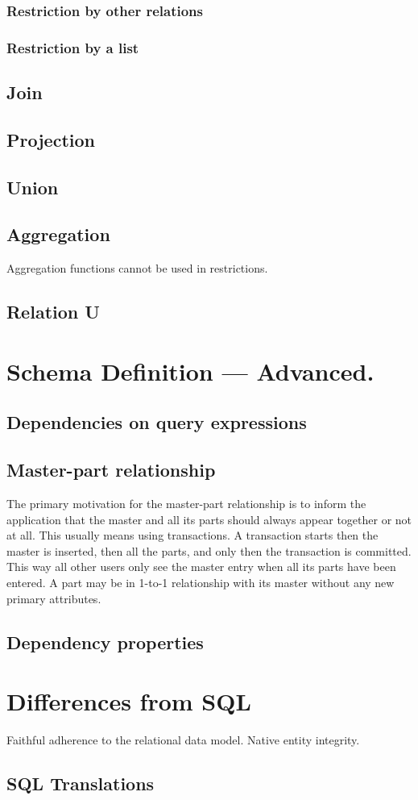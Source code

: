 \documentclass[letter,10pt]{article}
\begin{document}
\subsubsection{Restriction by other relations}
\subsubsection{Restriction by a list}

\subsection{Join}
\subsection{Projection}
\subsection{Union}
\subsection{Aggregation}
Aggregation functions cannot be used in restrictions. 
\subsection{Relation U}

\section{Schema Definition --- Advanced.}
\subsection{Dependencies on query expressions}
\subsection{Master-part relationship}
The primary motivation for the master-part relationship is to inform the application that the master and all its parts should always appear together or not at all.  
This usually means using transactions.  
A transaction starts then the master is inserted, then all the parts, and only then the transaction is committed.  
This way all other users only see the master entry when all its parts have been entered.
A part may be in 1-to-1 relationship with its master without any new primary attributes.
\subsection{Dependency properties}

\appendix

\section{Differences from SQL}
Faithful adherence to the relational data model. 
Native entity integrity.

\subsection{SQL Translations}



\end{document}
